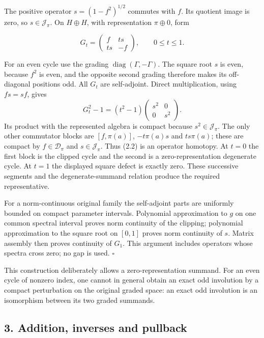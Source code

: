 \documentclass[
  11pt,
]{article}
\begin{document}
The positive operator \(s=(1-f^2)^{1/2}\) commutes with \(f\). Its
quotient image is zero, so \(s\in\mathcal J_\pi\). On \(H\oplus H\),
with representation \(\pi\oplus0\), form

\[
G_t=\begin{pmatrix}f&ts\\ts&-f\end{pmatrix},
\qquad 0\leq t\leq1.
\tag{2.2}
\]

For an even cycle use the grading
\(\operatorname{diag}(\Gamma,-\Gamma)\). The square root \(s\) is even,
because \(f^2\) is even, and the opposite second grading therefore makes
its off-diagonal positions odd. All \(G_t\) are self-adjoint. Direct
multiplication, using \(fs=sf\), gives \[
G_t^2-1=(t^2-1)
\begin{pmatrix}s^2&0\\0&s^2\end{pmatrix}.
\] Its product with the represented algebra is compact because
\(s^2\in\mathcal J_\pi\). The only other commutator blocks are
\([f,\pi(a)]\), \(-t\pi(a)s\) and \(ts\pi(a)\); these are compact by
\(f\in\mathcal D_\pi\) and \(s\in\mathcal J_\pi\). Thus (2.2) is an
operator homotopy. At \(t=0\) the first block is the clipped cycle and
the second is a zero-representation degenerate cycle. At \(t=1\) the
displayed square defect is exactly zero. These successive segments and
the degenerate-summand relation produce the required representative.

For a norm-continuous original family the self-adjoint parts are
uniformly bounded on compact parameter intervals. Polynomial
approximation to \(g\) on one common spectral interval proves norm
continuity of the clipping; polynomial approximation to the square root
on \([0,1]\) proves norm continuity of \(s\). Matrix assembly then
proves continuity of \(G_1\). This argument includes operators whose
spectra cross zero; no gap is used. \(\square\)

This construction deliberately allows a zero-representation summand. For
an even cycle of nonzero index, one cannot in general obtain an exact
odd involution by a compact perturbation on the original graded space:
an exact odd involution is an isomorphism between its two graded
summands.

\subsection{3. Addition, inverses and
pullback}\label{addition-inverses-and-pullback}
\end{document}
